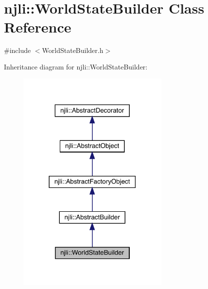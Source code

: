 \hypertarget{classnjli_1_1_world_state_builder}{}\section{njli\+:\+:World\+State\+Builder Class Reference}
\label{classnjli_1_1_world_state_builder}


{\ttfamily \#include $<$World\+State\+Builder.\+h$>$}



Inheritance diagram for njli\+:\+:World\+State\+Builder\+:\nopagebreak
\begin{figure}[H]
\begin{center}
\leavevmode
\includegraphics[width=213pt]{classnjli_1_1_world_state_builder__inherit__graph}
\end{center}
\end{figure}


